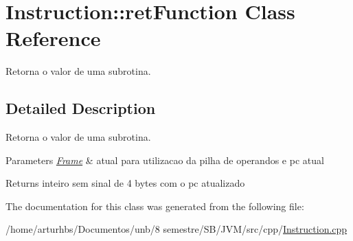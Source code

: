 \hypertarget{classInstruction_1_1retFunction}{}\section{Instruction\+:\+:ret\+Function Class Reference}
\label{classInstruction_1_1retFunction}


Retorna o valor de uma subrotina.  




\subsection{Detailed Description}
Retorna o valor de uma subrotina. 


\begin{DoxyParams}{Parameters}
{\em \hyperlink{classFrame}{Frame}} & atual para utilizacao da pilha de operandos e pc atual \\
\hline
\end{DoxyParams}
\begin{DoxyReturn}{Returns}
inteiro sem sinal de 4 bytes com o pc atualizado 
\end{DoxyReturn}


The documentation for this class was generated from the following file\+:\begin{DoxyCompactItemize}
\item 
/home/arturhbs/\+Documentos/unb/8 semestre/\+S\+B/\+J\+V\+M/src/cpp/\hyperlink{Instruction_8cpp}{Instruction.\+cpp}\end{DoxyCompactItemize}
